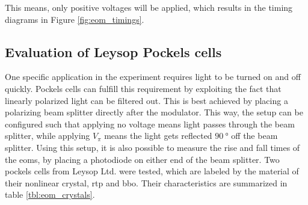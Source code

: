 This means, only positive voltages will be applied, which results in the timing diagrams in Figure \ref{fig:eom_timings}.

\begin{figure}[h]
\end{figure}

\begin{figure}[h]
\end{figure}

\subsection{Evaluation of Leysop Pockels cells}

One specific application in the experiment requires light to be turned on and off quickly. Pockels cells can fulfill this requirement by exploiting the fact that linearly polarized light can be filtered out. This is best achieved by placing a polarizing beam splitter directly after the modulator. This way, the setup can be configured such that applying no voltage means light passes through the beam splitter, while applying $V_\pi$ means the light gets reflected $\SI{90}{\degree}$ off the beam splitter.
Using this setup, it is also possible to measure the rise and fall times of the \acp{eom}, by placing a photodiode on either end of the beam splitter. Two  pockels cells from Leysop Ltd. were tested, which are labeled by the material of their nonlinear crystal, \ac{rtp} and \ac{bbo}. Their characteristics are summarized in table \ref{tbl:eom_crystals}.

